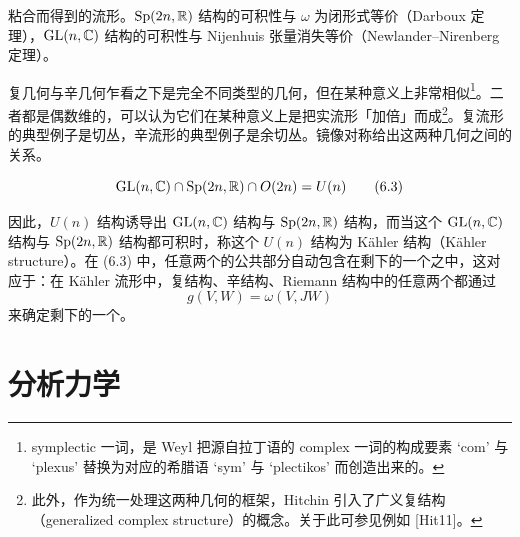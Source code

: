 
粘合而得到的流形。$\mathrm{Sp}(2n,\mathbb{R})$ 结构的可积性与 $\omega$ 为闭形式等价（Darboux 定理），$\mathrm{GL}(n,\mathbb{C})$ 结构的可积性与 Nijenhuis 张量消失等价（Newlander–Nirenberg 定理）。

复几何与辛几何乍看之下是完全不同类型的几何，但在某种意义上非常相似\footnote{symplectic 一词，是 Weyl 把源自拉丁语的 complex 一词的构成要素 ‘com’ 与 ‘plexus’ 替换为对应的希腊语 ‘sym’ 与 ‘plectikos’ 而创造出来的。}。二者都是偶数维的，可以认为它们在某种意义上是把实流形「加倍」而成\footnote{此外，作为统一处理这两种几何的框架，Hitchin 引入了广义复结构（generalized complex structure）的概念。关于此可参见例如 [Hit11]。}。复流形的典型例子是切丛，辛流形的典型例子是余切丛。镜像对称给出这两种几何之间的关系。

\begin{equation}
    \mathrm{GL}(n,\mathbb{C})\cap\mathrm{Sp}(2n,\mathbb{R})\cap O(2n)=U(n) \tag{6.3}
\end{equation}

因此，$U(n)$ 结构诱导出 $\mathrm{GL}(n,\mathbb{C})$ 结构与 $\mathrm{Sp}(2n,\mathbb{R})$ 结构，而当这个 $\mathrm{GL}(n,\mathbb{C})$ 结构与 $\mathrm{Sp}(2n,\mathbb{R})$ 结构都可积时，称这个 $U(n)$ 结构为 Kähler 结构（Kähler structure）。在 (6.3) 中，任意两个的公共部分自动包含在剩下的一个之中，这对应于：在 Kähler 流形中，复结构、辛结构、Riemann 结构中的任意两个都通过
\begin{equation}
    g(V,W)=\omega(V,JW) \tag{6.4}
\end{equation}
来确定剩下的一个。

\section{分析力学}

